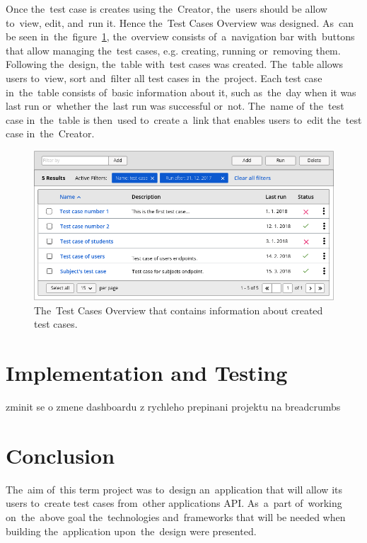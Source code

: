 Once the~test case is creates using the~Creator, the~users should be allow
to~view, edit, and~run it. Hence the~Test Cases Overview was designed. As~can be
seen in~the~figure~\ref{test-cases}, the~overview consists of~a~navigation bar
with~buttons that allow managing the~test cases, e.g. creating, running
or~removing them. Following the~design, the~table with~test cases was created.
The~table allows users to~view, sort and~filter all test cases in~the~project.
Each test case in~the~table consists of~basic information about it, such
as~the~day when it was last run or~whether the~last run was successful or~not.
The~name of~the~test case in~the~table is then~used to~create a~link that
enables users to~edit the~test case in~the~Creator.

\begin{figure}[!hbt]
	\centering
	\includegraphics[scale=0.4]{./designs/drafts-1.0/test-cases.png}
	\caption{The~Test Cases Overview that contains information about created test
	cases.}
	\label{test-cases}
\end{figure}




\chapter{Implementation and Testing}
zminit se o zmene dashboardu z rychleho prepinani projektu na breadcrumbs


\chapter{Conclusion}
The~aim of~this term project was to~design an~application that will allow its
users to~create test cases from~other applications API. As~a~part of~working
on~the~above goal the~technologies and~frameworks that will be needed when
building the~application upon~the~design were presented.

